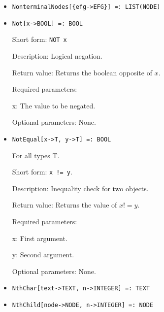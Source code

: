 \begin{itemize}
\item
\protect \large \begin{verbatim} 
NonterminalNodes[{efg->EFG}] =: LIST(NODE)
\end{verbatim}\normalsize

\item
\protect \large \begin{verbatim}
Not[x->BOOL] =: BOOL
\end{verbatim}\normalsize

\bd
\item
[Short form:] \verb+NOT x+
\item
[Description:] Logical negation.
\item
[Return value:] Returns the boolean opposite of $x$.  
\item
[Required parameters:]\hfil\null
\bd
\item
[x:] The value to be negated.
\ed
\item
[Optional parameters:] None.
\ed

\item
\protect \large \begin{verbatim}
NotEqual[x->T, y->T] =: BOOL
\end{verbatim}\normalsize

For all types T.

\bd
\item
[Short form:] \verb+x != y+.
\item
[Description:] Inequality check for two objects.
\item
[Return value:] Returns the value of $x != y$.
\item
[Required parameters:]\hfil\null
	
\bd
\item
[x:] First argument.
\item
[y:] Second argument.
\ed

\item
[Optional parameters:] None.

\ed

\item
\protect \large \begin{verbatim}
NthChar[text->TEXT, n->INTEGER] =: TEXT
\end{verbatim}\normalsize

\item
\protect \large \begin{verbatim} 
NthChild[node->NODE, n->INTEGER] =: NODE
\end{verbatim}\normalsize


\end{itemize}
